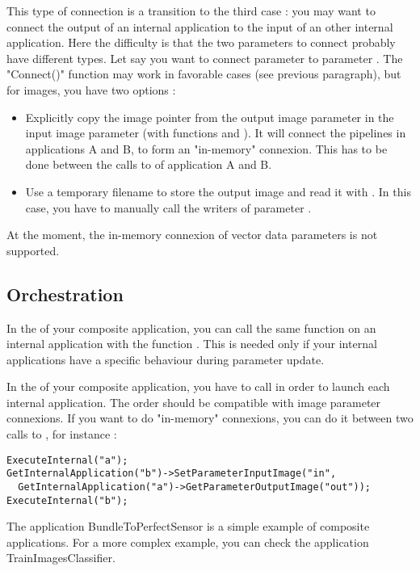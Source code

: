 This type of connection is a transition to the third case : you may want to connect
the output of an internal application to the input of an other internal application.
Here the difficulty is that the two parameters to connect probably have different
types. Let say you want to connect parameter  to parameter .
The "Connect()" function may work in favorable cases (see previous paragraph),
but for images, you have two options :
\begin{itemize}
\item Explicitly copy the image pointer from the output image parameter in the input
image parameter (with functions  and
). It will connect the pipelines in applications
A and B, to form an "in-memory" connexion. This has to be done between the calls
to  of application A and B.
\item Use a temporary filename to store the output image  and read it
with . In this case, you have to manually call the writers of parameter
.
\end{itemize}

At the moment, the in-memory connexion of vector data parameters is not supported.

\subsection{Orchestration}

In the  of your composite application, you can call
the same function on an internal application with the function .
This is needed only if your internal applications have a specific behaviour during
parameter update.

In the  of your composite application, you have to call 
in order to launch each internal application. The order should be compatible with
image parameter connexions. If you want to do "in-memory" connexions, you can do it between
two calls to , for instance :

\begin{verbatim}
ExecuteInternal("a");
GetInternalApplication("b")->SetParameterInputImage("in",
  GetInternalApplication("a")->GetParameterOutputImage("out"));
ExecuteInternal("b");
\end{verbatim}

The application BundleToPerfectSensor is a simple example of composite applications.
For a more complex example, you can check the application TrainImagesClassifier.

